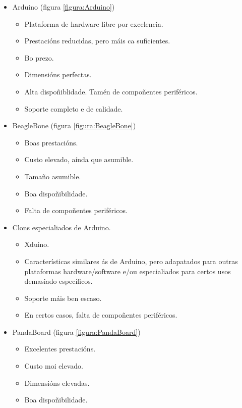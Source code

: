   \begin{itemize}
   \item Arduino \cite{Arduino} (figura \ref{figura:Arduino})
         \begin{itemize}
          \item Plataforma de hardware libre por excelencia.
          \item Prestacións reducidas, pero máis ca suficientes.
          \item Bo prezo.
          \item Dimensións perfectas.
          \item Alta dispoñiblidade. Tamén de compoñentes periféricos.
          \item Soporte completo e de calidade.
         \end{itemize}
   \item BeagleBone \cite{BeagleBone} (figura \ref{figura:BeagleBone})
         \begin{itemize}
          \item Boas prestacións.
          \item Custo elevado, aínda que asumible.
          \item Tamaño asumible.
          \item Boa dispoñibilidade.
          \item Falta de compoñentes periféricos.
         \end{itemize}
   \item Clons especialiados de Arduino.
         \begin{itemize}
          \item Xduino.
          \item Características similares ás de Arduino, pero adapatados para
                outras plataformas hardware/software e/ou especialiados para
                certos usos demasiado específicos.
          \item Soporte máis ben escaso.
          \item En certos casos, falta de compoñentes periféricos.
         \end{itemize}
   \item PandaBoard \cite{PandaBoard} (figura \ref{figura:PandaBoard})
         \begin{itemize}
          \item Excelentes prestacións.
          \item Custo moi elevado.
          \item Dimensións elevadas.
          \item Boa dispoñibilidade.

\end{itemize}
\end{itemize}
